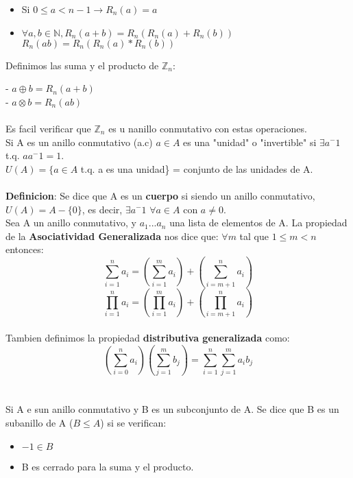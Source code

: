 \documentclass[11pt]{article}
\begin{document}
\begin{itemize}
\item Si $0 \leq a < n-1  \rightarrow R_n(a) = a$
\item $\forall a,b \in \mathbb{N}, R_n(a+b) = R_n(R_n(a) + R_n(b))$\\$R_n(ab) = R_n(R_n(a)*R_n(b))$

\end{itemize} 

Definimos las suma y el producto de $\mathbb{Z}_n$:

- $a\oplus b = R_n(a+b)$\\
\hspace*{0.6cm}- $a\otimes b = R_n(ab)$\\\\

Es facil verificar que $\mathbb{Z}_n$ es u nanillo conmutativo con estas operaciones.\\
Si A es un anillo conmutativo (a.c) $a \in A$ es una "unidad" o "invertible" si $\exists a^-1$ t.q. $ aa^-1 = 1$.\\ $U(A) = \{ a \in A$ t.q. a es una unidad\} = conjunto de las unidades de A.\\\\

\textbf{Definicion}: Se dice que A es un \textbf{cuerpo} si siendo un anillo conmutativo, $U(A) = A - \{0\}$, es decir, $\exists a^-1$ $\forall a \in A$ con $a \neq 0$.\\


Sea A un anillo conmutativo, y $a_1 ... a_n$ una lista de elementos de A.
La propiedad de la \textbf{Asociatividad Generalizada} nos dice que:
$\forall m$ tal que $1 \leq m < n$ entonces: \[\sum_{i=1}^{n}a_i = (\sum_{i=1}^{m}a_i) + (\sum_{i=m+1}^{n}a_i)\]\[\prod_{i=1}^{n}a_i = (\prod_{i=1}^{m}a_i) + (\prod_{i=m+1}^{n}a_i)\]\\

Tambien definimos la propiedad \textbf{distributiva generalizada} como:\\

\[(\sum_{i=0}^{n} a_i)(\sum_{j=1}^{m}b_j) = \sum_{i=1}^{n}\sum_{j=1}^{m}a_i b_j\]\\\\

Si A e sun anillo conmutativo y B es un subconjunto de A. Se dice que B es un subanillo de A ($B \leq A$) si se verifican:
\begin{itemize}
\item $-1 \in B$
\item B es cerrado para la suma y el producto.
\end{itemize}
\end{document}
